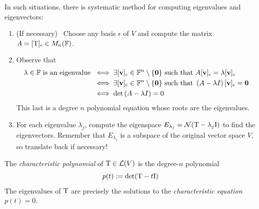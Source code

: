 In such situations, there is systematic method for computing eigenvalues and eigenvectors:
\begin{enumerate}
  \item (If necessary) \ Choose any basis $\epsilon$ of $V$ and compute the matrix $A=[\mathrm{T}]_\epsilon\in M_n(\mathbb{F})$.
  \item Observe that
  \begin{align*}
	  \lambda\in\mathbb{F}\text{ is an eigenvalue }&\iff \exists [{\mathbf{v}}]_\epsilon\in\mathbb{F}^n\setminus\{\mathbf{0}\}\text{ such that }A[{\mathbf{v}}]_\epsilon=\lambda[{\mathbf{v}}]_\epsilon\\
	  &\iff \exists [{\mathbf{v}}]_\epsilon\in\mathbb{F}^n\setminus\{\mathbf{0}\}\text{ such that }\left(A-\lambda I\right)[{\mathbf{v}}]_\epsilon=\mathbf{0}\\
	  &\iff \det\left(A-\lambda I\right)=0
  \end{align*}
  This last is a degree $n$ polynomial equation whose roots are the eigenvalues.
  \item For each eigenvalue $\lambda_j$, compute the eigenspace $E_{\lambda_j}=\mathcal{N}(\mathrm{T}-\lambda_j\mathrm{I})$ to find the eigenvectors. Remember that $E_{\lambda_j}$ is a subspace of the original vector space $V$, so translate back if necessary!
\end{enumerate}



\begin{defn}{}{}
	The \emph{characteristic polynomial} of $\mathrm{T}\in\mathcal{L}(V)$ is the degree-$n$ polynomial\footnotemark{}
	\[
		p(t):=\det(\mathrm{T}-t\mathrm{I})
	\]
	The eigenvalues of $\mathrm{T}$ are precisely the solutions to the \emph{characteristic equation} $p(t)=0$.
\end{defn}



